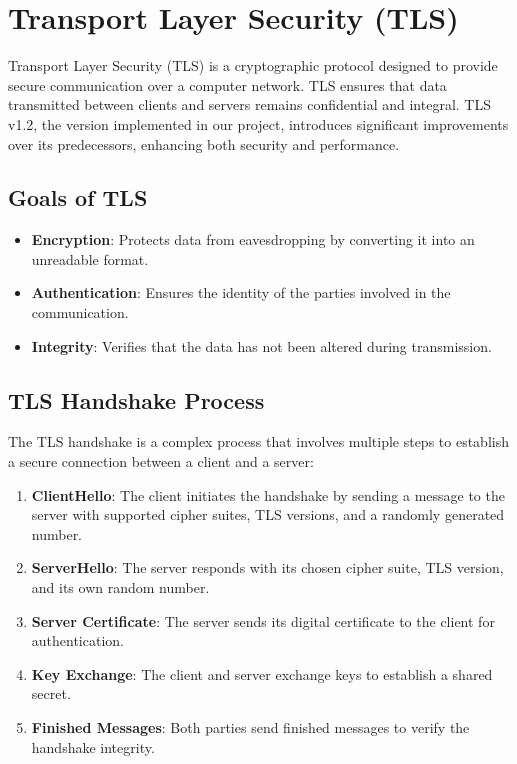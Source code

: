 \newpage

\section{Transport Layer Security (TLS)}

Transport Layer Security (TLS) is a cryptographic protocol designed to provide secure communication over a computer network. TLS ensures that data transmitted between clients and servers remains confidential and integral. TLS v1.2, the version implemented in our project, introduces significant improvements over its predecessors, enhancing both security and performance.

\subsection{Goals of TLS}
\begin{itemize}
    \item \textbf{Encryption}: Protects data from eavesdropping by converting it into an unreadable format.
    \item \textbf{Authentication}: Ensures the identity of the parties involved in the communication.
    \item \textbf{Integrity}: Verifies that the data has not been altered during transmission.
\end{itemize}

\subsection{TLS Handshake Process}
The TLS handshake is a complex process that involves multiple steps to establish a secure connection between a client and a server:
\begin{enumerate}
    \item \textbf{ClientHello}: The client initiates the handshake by sending a message to the server with supported cipher suites, TLS versions, and a randomly generated number.
    \item \textbf{ServerHello}: The server responds with its chosen cipher suite, TLS version, and its own random number.
    \item \textbf{Server Certificate}: The server sends its digital certificate to the client for authentication.
    \item \textbf{Key Exchange}: The client and server exchange keys to establish a shared secret.
    \item \textbf{Finished Messages}: Both parties send finished messages to verify the handshake integrity.
\end{enumerate}

